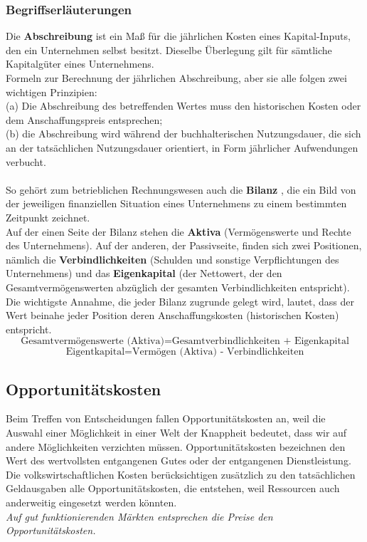 \documentclass[10pt]{scrartcl}
\begin{document}
\subsubsection{Begriffserläuterungen}
Die {\bf Abschreibung} ist ein Maß für die jährlichen Kosten eines Kapital-Inputs, den ein Unternehmen selbst besitzt. Dieselbe Überlegung gilt für sämtliche Kapitalgüter eines Unternehmens.\\
Formeln zur Berechnung der jährlichen Abschreibung, aber sie alle folgen zwei wichtigen Prinzipien:\\ (a) Die Abschreibung des betreffenden Wertes muss den historischen Kosten oder dem Anschaffungspreis entsprechen;\\ (b) die Abschreibung wird während der buchhalterischen Nutzungsdauer, die sich an der tatsächlichen Nutzungsdauer orientiert, in Form jährlicher Aufwendungen verbucht. \\ 
\\
So gehört zum betrieblichen Rechnungswesen auch die {\bf Bilanz }, die ein Bild von der jeweiligen finanziellen Situation eines Unternehmens zu einem bestimmten Zeitpunkt zeichnet.\\
Auf der einen Seite der Bilanz stehen die {\bf Aktiva} (Vermögenswerte und Rechte des Unternehmens). Auf der anderen, der Passivseite, finden sich zwei Positionen, nämlich die {\bf Verbindlichkeiten }(Schulden und sonstige Verpflichtungen des Unternehmens) und das {\bf Eigenkapital }(der Nettowert, der den Gesamtvermögenswerten abzüglich der gesamten Verbindlichkeiten entspricht).\\
Die wichtigste Annahme, die jeder Bilanz zugrunde gelegt wird, lautet, dass der Wert beinahe jeder Position deren Anschaffungskosten (historischen Kosten) entspricht. \\
\begin{equation}
\text{Gesamtvermögenswerte (Aktiva)} = \text{Gesamtverbindlichkeiten + Eigenkapital} \nonumber
\end{equation}
\begin{equation}
\text{Eigentkapital} = \text{Vermögen (Aktiva) - Verbindlichkeiten} \nonumber
\end{equation}
\subsection{Opportunitätskosten}
Beim Treffen von Entscheidungen fallen Opportunitätskosten an, weil die Auswahl einer Möglichkeit in einer Welt der Knappheit bedeutet, dass wir auf andere Möglichkeiten verzichten müssen. Opportunitätskosten bezeichnen den Wert des wertvollsten entgangenen Gutes oder der entgangenen Dienstleistung.\\
Die volkswirtschaftlichen Kosten berücksichtigen zusätzlich zu den tatsächlichen Geldausgaben alle Opportunitätskosten, die entstehen, weil Ressourcen auch anderweitig eingesetzt werden könnten. \\
{\it Auf gut funktionierenden Märkten entsprechen die Preise den Opportunitätskosten. }
\end{document}
